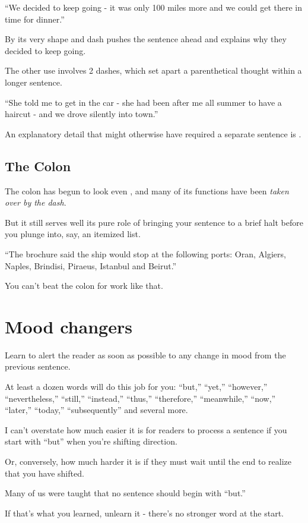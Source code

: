 \documentclass{book}
\numberwithin{equation}{section}
\begin{document}
``We decided to keep going - it was only 100 miles more and we could get there in time for dinner.''

By its very shape and dash pushes the sentence ahead and explains why they decided to keep going.

The other use involves 2 dashes, which set apart a parenthetical thought within a longer sentence.

``She told me to get in the car - she had been after me all summer to have a haircut - and we drove silently into town.''

An explanatory detail that might otherwise have required a separate sentence is .

\subsection{The Colon}
The colon has begun to look even , and many of its functions have been \textit{taken over by the dash}.

But it still serves well its pure role of bringing your sentence to a brief halt before you plunge into, say, an itemized list.

``The brochure said the ship would stop at the following ports: Oran, Algiers, Naples, Brindisi, Piraeus, Istanbul and Beirut.''

You can't beat the colon for work like that.

\section{Mood changers}
Learn to alert the reader as soon as possible to any change in mood from the previous sentence.

At least a dozen words will do this job for you: ``but,'' ``yet,'' ``however,'' ``nevertheless,'' ``still,'' ``instead,'' ``thus,'' ``therefore,'' ``meanwhile,'' ``now,'' ``later,'' ``today,'' ``subsequently'' and several more.

I can't overstate how much easier it is for readers to process a sentence if you start with ``but'' when you're shifting direction.

Or, conversely, how much harder it is if they must wait until the end to realize that you have shifted.

%
Many of us were taught that no sentence should begin with ``but.''

If that's what you learned, unlearn it - there's no stronger word at the start.
\end{document}
